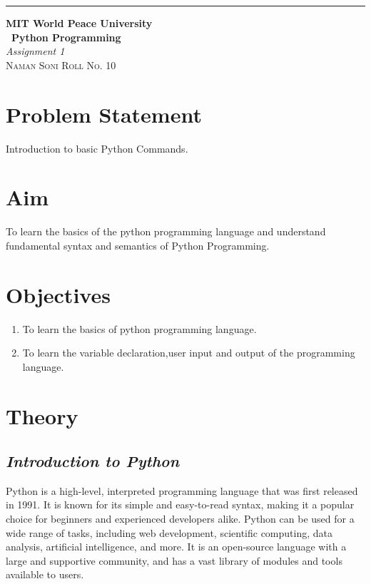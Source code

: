 \documentclass{article}
\begin{document}
\begin{titlepage} %

	\raggedleft\rule{1pt}{\textheight} %
	\hspace{0.05\textwidth} %
	\parbox[b]{0.75\textwidth}
    { %
		
		{\Huge\bfseries MIT World Peace University \\[0.5\baselineskip] \ Python Programming}\\[2\baselineskip] %
		{\large\textit{Assignment 1}}\\[4\baselineskip] %
		{\Large\textsc{Naman Soni Roll No. 10}} %
		
		\vspace{0.5\textheight} %
	}

\end{titlepage}
\tableofcontents
\pagebreak
\section{\textbf{Problem Statement}}
Introduction to basic Python Commands.
\section{\textbf{Aim}}
To learn the basics of the python programming language and understand fundamental syntax and semantics of Python Programming.
\section{\textbf{Objectives}}
\begin{enumerate}
    \item To learn the basics of python programming language.
    \item To learn the variable declaration,user input and output of the programming language.
\end{enumerate}
\section{\textbf{Theory}}
\subsection{\textbf{\textit{Introduction to Python}}}
Python is a high-level, interpreted programming language that was first released in 1991. It is known for its simple and easy-to-read syntax, making it a popular choice for beginners and experienced developers alike. Python can be used for a wide range of tasks, including web development, scientific computing, data analysis, artificial intelligence, and more. It is an open-source language with a large and supportive community, and has a vast library of modules and tools available to users.
\end{document}
